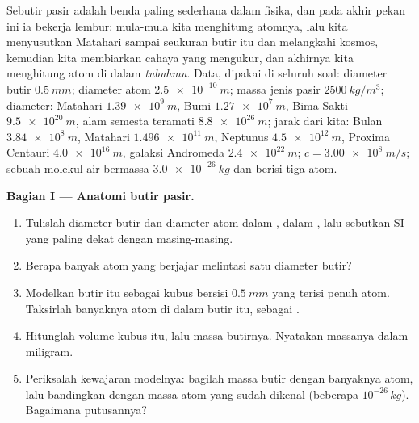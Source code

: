 \begin{problem}
\label{pb:g10:orders-of-magnitude:1}
Sebutir pasir adalah benda paling sederhana dalam fisika, dan pada
akhir pekan ini ia bekerja lembur: mula-mula kita menghitung atomnya,
lalu kita menyusutkan Matahari sampai seukuran butir itu dan melangkahi
kosmos, kemudian kita membiarkan cahaya yang mengukur, dan akhirnya
kita menghitung atom di dalam \emph{tubuhmu}. Data, dipakai di seluruh
soal: diameter butir $\qty{0.5}{mm}$; diameter atom
$\qty{2.5e-10}{m}$; massa jenis pasir $\qty{2500}{kg/m^3}$; diameter:
Matahari $\qty{1.39e9}{m}$, Bumi $\qty{1.27e7}{m}$, Bima Sakti
$\qty{9.5e20}{m}$, alam semesta teramati $\qty{8.8e26}{m}$; jarak dari
kita: Bulan $\qty{3.84e8}{m}$, Matahari $\qty{1.496e11}{m}$, Neptunus
$\qty{4.5e12}{m}$, Proxima Centauri $\qty{4.0e16}{m}$, galaksi
Andromeda $\qty{2.4e22}{m}$; $c = \qty{3.00e8}{m/s}$; sebuah molekul
air bermassa $\qty{3.0e-26}{kg}$ dan berisi tiga atom.

\medskip
\noindent\textbf{Bagian I --- Anatomi butir pasir.}
\begin{enumerate}
  \item Tulislah diameter butir dan diameter atom dalam , dalam
        , lalu sebutkan  SI yang paling dekat
        dengan masing-masing.
  \item Berapa banyak atom yang berjajar melintasi satu diameter butir?
  \item Modelkan butir itu sebagai kubus bersisi $\qty{0.5}{mm}$ yang
        terisi penuh atom. Taksirlah banyaknya atom di dalam butir itu,
        sebagai .
  \item Hitunglah volume kubus itu, lalu massa butirnya. Nyatakan
        massanya dalam miligram.
  \item Periksalah kewajaran modelnya: bagilah massa butir dengan
        banyaknya atom, lalu bandingkan dengan  massa atom
        yang sudah dikenal (beberapa $10^{-26}\,\unit{kg}$). Bagaimana
        putusannya?
\end{enumerate}


\end{problem}
